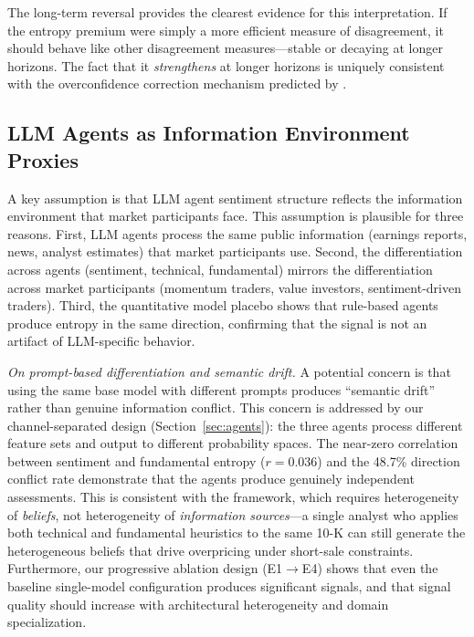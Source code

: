 \documentclass[12pt,a4paper]{article}
\begin{document}
The long-term reversal provides the clearest evidence for this interpretation. If the entropy premium were simply a more efficient measure of disagreement, it should behave like other disagreement measures---stable or decaying at longer horizons. The fact that it \textit{strengthens} at longer horizons is uniquely consistent with the overconfidence correction mechanism predicted by \citet{Daniel1998}.

\subsection{LLM Agents as Information Environment Proxies}

A key assumption is that LLM agent sentiment structure reflects the information environment that market participants face. This assumption is plausible for three reasons. First, LLM agents process the same public information (earnings reports, news, analyst estimates) that market participants use. Second, the differentiation across agents (sentiment, technical, fundamental) mirrors the differentiation across market participants (momentum traders, value investors, sentiment-driven traders). Third, the quantitative model placebo shows that rule-based agents produce entropy in the same direction, confirming that the signal is not an artifact of LLM-specific behavior.

\textit{On prompt-based differentiation and semantic drift.} A potential concern is that using the same base model with different prompts produces ``semantic drift'' rather than genuine information conflict. This concern is addressed by our channel-separated design (Section~\ref{sec:agents}): the three agents process different feature sets and output to different probability spaces. The near-zero correlation between sentiment and fundamental entropy ($r = 0.036$) and the 48.7\% direction conflict rate demonstrate that the agents produce genuinely independent assessments. This is consistent with the \citet{Miller1977} framework, which requires heterogeneity of \textit{beliefs}, not heterogeneity of \textit{information sources}---a single analyst who applies both technical and fundamental heuristics to the same 10-K can still generate the heterogeneous beliefs that drive overpricing under short-sale constraints. Furthermore, our progressive ablation design (E1$\to$E4) shows that even the baseline single-model configuration produces significant signals, and that signal quality should increase with architectural heterogeneity and domain specialization.
\end{document}
